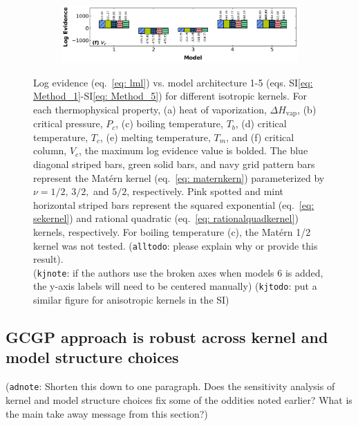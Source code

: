 \documentclass[journal=jacsat,manuscript=article]{achemso}
\newcommand{\kjnote}[1]{{\color{Blue} (\texttt{kjnote}: #1)}}
\newcommand{\kjtodo}[1]{{\color{Red} (\texttt{kjtodo}: #1)}}
\newcommand{\alltodo}[1]{{\color{Cyan} (\texttt{alltodo}: #1)}}
\newcommand{\adnote}[1]{{\color{OliveGreen} (\texttt{adnote}: #1)}}
\newcommand{\siref}[1]{SI\eqref{#1}}
\begin{document}
\begin{figure}
\begin{subfigure}[b]{0.75\textwidth}
     \end{subfigure}
     \hfill
     \begin{subfigure}[b]{0.75\textwidth}
         \centering
         \includegraphics[width=\textwidth]{images/lml_bar_chart_Vc.png}
     \end{subfigure}
     \caption{Log evidence (eq.~\eqref{eq: lml}) vs. model architecture 1-5 (eqs. \siref{eq: Method_1}-\siref{eq: Method_5}) for different isotropic kernels. For each thermophysical property, (a) heat of vaporization, $\Delta H_{\text{vap}}$, (b) critical pressure, $P_c$, (c) boiling temperature, $T_b$, (d) critical temperature, $T_c$, (e) melting temperature, $T_m$, and (f) critical column, $V_c$, the maximum log evidence value is bolded. The blue diagonal striped bars, green solid bars, and navy grid pattern bars represent the Mat\'ern kernel (eq.~\eqref{eq: maternkern}) parameterized by $\nu = 1/2, \, 3/2,$ and $5/2$, respectively. Pink spotted and mint horizontal striped bars represent the squared exponential (eq.~\eqref{eq: sekernel}) and rational quadratic (eq.~\eqref{eq: rationalquadkernel}) kernels, respectively. For boiling temperature (c), the Mat\'ern 1/2 kernel was not tested.
     \alltodo{please explain why or provide this result}. \\
     \kjnote{if the authors use the broken axes when models 6 is added, the y-axis labels will need to be centered manually}
     \kjtodo{put a similar figure for anisotropic kernels in the SI}}
     \label{fig: lmlbarchart}
\end{figure}
\FloatBarrier

\subsection{GCGP approach is robust across kernel and model structure choices} \label{sec:kern_sweep}

\adnote{Shorten this down to one paragraph. Does the sensitivity analysis of kernel and model structure choices fix some of the oddities noted earlier? What is the main take away message from this section?}
\end{document}
